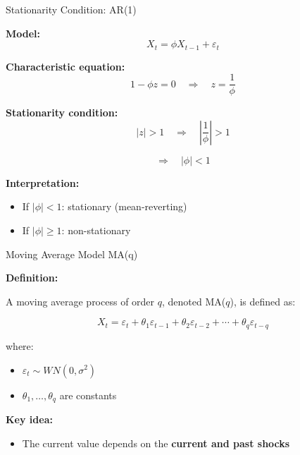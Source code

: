 \documentclass[aspectratio=169]{beamer}
\begin{document}
\begin{frame}{Stationarity Condition: AR(1)}

\textbf{Model:}
\[
X_t = \phi X_{t-1} + \varepsilon_t
\]

\vspace{0.4cm}

\textbf{Characteristic equation:}
\[
1 - \phi z = 0 \quad \Rightarrow \quad z = \frac{1}{\phi}
\]

\vspace{0.4cm}

\textbf{Stationarity condition:}
\[
|z| > 1 \quad \Rightarrow \quad \left|\frac{1}{\phi}\right| > 1
\]

\[
\Rightarrow \quad |\phi| < 1
\]

\vspace{0.4cm}

\textbf{Interpretation:}
\begin{itemize}
    \item If $|\phi| < 1$: stationary (mean-reverting)
    \item If $|\phi| \geq 1$: non-stationary
\end{itemize}

\end{frame}

\begin{frame}{Moving Average Model MA(q)}

\textbf{Definition:}

\vspace{0.3cm}

A moving average process of order $q$, denoted MA($q$), is defined as:

\[
X_t = \varepsilon_t + \theta_1 \varepsilon_{t-1} + \theta_2 \varepsilon_{t-2} + \cdots + \theta_q \varepsilon_{t-q}
\]

\vspace{0.3cm}

where:
\begin{itemize}
    \item $\varepsilon_t \sim WN(0,\sigma^2)$
    \item $\theta_1,\dots,\theta_q$ are constants
\end{itemize}

\vspace{0.4cm}

\textbf{Key idea:}
\begin{itemize}
    \item The current value depends on the \textbf{current and past shocks}
\end{itemize}

\end{frame}
\end{document}
